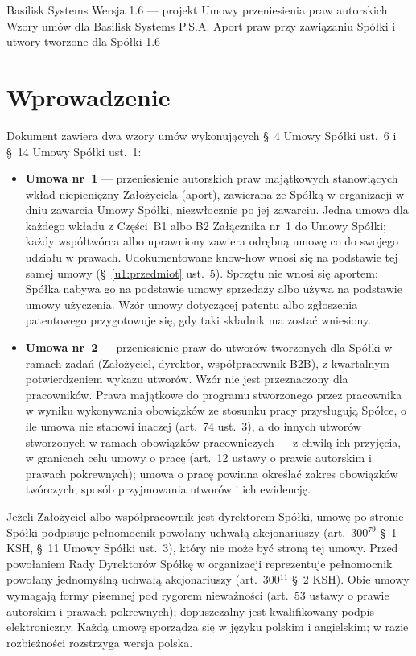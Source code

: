 \documentclass[12pt,a4paper]{report}
\newcommand{\US}[1]{§~#1 Umowy Spółki}
\begin{document}
\BusinessPlanTitlePage
  {Basilisk Systems}
  {Wersja 1.6 --- projekt}
  {Umowy przeniesienia praw autorskich}
  {Wzory umów dla Basilisk Systems P.S.A.}
  {Aport praw przy zawiązaniu Spółki i utwory tworzone dla Spółki}
  {1.6}

\tableofcontents
\newpage

\chapter*{Wprowadzenie}

Dokument zawiera dwa wzory umów wykonujących \US{4} ust.~6 i \US{14} ust.~1:

\begin{itemize}
  \item \textbf{Umowa nr~1} --- przeniesienie autorskich praw majątkowych stanowiących wkład niepieniężny Założyciela (aport), zawierana ze Spółką w organizacji w dniu zawarcia Umowy Spółki, niezwłocznie po jej zawarciu. Jedna umowa dla każdego wkładu z Części~B1 albo B2 Załącznika nr~1 do Umowy Spółki; każdy współtwórca albo uprawniony zawiera odrębną umowę co do swojego udziału w prawach. Udokumentowane know-how wnosi się na podstawie tej samej umowy (§~\ref{u1:przedmiot} ust.~5). Sprzętu nie wnosi się aportem: Spółka nabywa go na podstawie umowy sprzedaży albo używa na podstawie umowy użyczenia. Wzór umowy dotyczącej patentu albo zgłoszenia patentowego przygotowuje się, gdy taki składnik ma zostać wniesiony.
  \item \textbf{Umowa nr~2} --- przeniesienie praw do utworów tworzonych dla Spółki w ramach zadań (Założyciel, dyrektor, współpracownik B2B), z kwartalnym potwierdzeniem wykazu utworów. Wzór nie jest przeznaczony dla pracowników. Prawa majątkowe do programu stworzonego przez pracownika w wyniku wykonywania obowiązków ze stosunku pracy przysługują Spółce, o ile umowa nie stanowi inaczej (art.~74 ust.~3), a do innych utworów stworzonych w ramach obowiązków pracowniczych --- z chwilą ich przyjęcia, w granicach celu umowy o pracę (art.~12 ustawy o prawie autorskim i prawach pokrewnych); umowa o pracę powinna określać zakres obowiązków twórczych, sposób przyjmowania utworów i ich ewidencję.
\end{itemize}

Jeżeli Założyciel albo współpracownik jest dyrektorem Spółki, umowę po stronie Spółki podpisuje pełnomocnik powołany uchwałą akcjonariuszy (art.~300$^{79}$ §~1 KSH, \US{11} ust.~3), który nie może być stroną tej umowy. Przed powołaniem Rady Dyrektorów Spółkę w organizacji reprezentuje pełnomocnik powołany jednomyślną uchwałą akcjonariuszy (art.~300$^{11}$ §~2 KSH). Obie umowy wymagają formy pisemnej pod rygorem nieważności (art.~53 ustawy o prawie autorskim i prawach pokrewnych); dopuszczalny jest kwalifikowany podpis elektroniczny. Każdą umowę sporządza się w języku polskim i angielskim; w razie rozbieżności rozstrzyga wersja polska.
\end{document}
